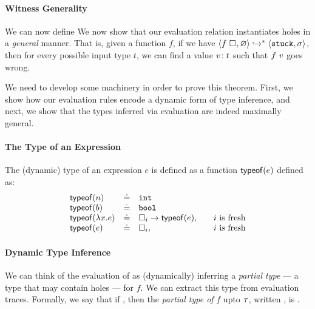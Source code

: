\paragraph{Witness Generality} We can now define
We now show that our evaluation relation instantiates holes in a
\emph{general} manner. That is, given a function $f$, if we have
$\langle f \ \square_{}, \varnothing \rangle \hookrightarrow^{*} \langle \mathtt{stuck}, \sigma \rangle$, then for every
possible input type $t$, we can find a value ${v} \colon {t}$
such that $f \ v$ goes wrong.


We need to develop some machinery in order to prove this theorem.
First, we show how our evaluation rules encode a dynamic form of
type inference, and next, we show that the types inferred via
evaluation are indeed maximally general.

\paragraph{The Type of an Expression} The (dynamic) type of an
expression $e$ is defined as a function $$ defined as:
  \[
  \begin{array}{lcll}
    \typeof{n}   & \defeq & \tint & \\
    \typeof{b}   & \defeq & \tbool & \\
    \typeof{\efun{x}{e}} & \defeq & \tfun{\thole{i}}{\typeof{e}}, & \quad \text{$i$ is fresh} \\
    \typeof{e} & \defeq & \thole{i}, & \quad \text{$i$ is fresh} \\
  \end{array}
  \]

\paragraph{Dynamic Type Inference}
We can think of the evaluation of  as (dynamically)
inferring a \emph{partial type} --- a type that may contain holes ---
for $f$.
%
We can extract this type from evaluation traces.
%
Formally, we say that if ,
then the \emph{partial type of} $f$ upto $\tau$, written ,
is .
%

